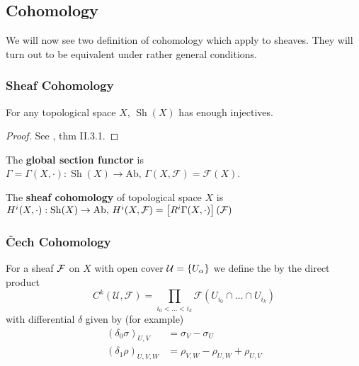 \documentclass{article}
\begin{document}
\subsection{Cohomology}\label{subsec: cohomology of sheaves}
We will now see two definition of cohomology which apply to sheaves. They will turn out to be equivalent under rather general conditions. 
\subsubsection{Sheaf Cohomology}

\begin{lemma}
	For any topological space $X$, $\operatorname{Sh}(X)$ has enough injectives. 
\end{lemma}
\begin{proof}
	See \cite{Iversen1984}, thm II.3.1. 
\end{proof}

\begin{definition}
	The \textbf{global section functor} is $\Gamma = \Gamma(X,\cdot):\operatorname{Sh}(X) \to \text{Ab}, \, \Gamma(X,\mathcal{F}) = \mathcal{F}(X)$. 
\end{definition}

\begin{definition}
	The \textbf{sheaf cohomology} of topological space $X$ is $H^i(X,\cdot) : \operatorname{Sh}(X) \to \text{Ab}, \, H^i(X,\mathcal{F}) = \left[ R^i\Gamma(X,\cdot) \right](\mathcal{F})$
\end{definition}

\subsubsection{\v{C}ech Cohomology}





\begin{definition}
	For a sheaf $\mathcal{F}$ on $X$ with open cover $\mathcal{U} = \left\{ U_\alpha \right\}$ we define the  by the direct product 
	\[
	C^k(\mathcal{U},\mathcal{F}) = \prod_{i_0 < \dots <i_k} \mathcal{F}(U_{i_0} \cap \dots \cap U_{i_k})
	\]
	with differential $\delta$ given by (for example) 
	\begin{align*}
	(\delta_0 \sigma)_{U,V} &= \sigma_V - \sigma_U \\
	(\delta_1 \rho)_{U,V,W} &= \rho_{V,W} - \rho_{U,W} + \rho_{U,V} 
	\end{align*}
\end{definition}
\end{document}
